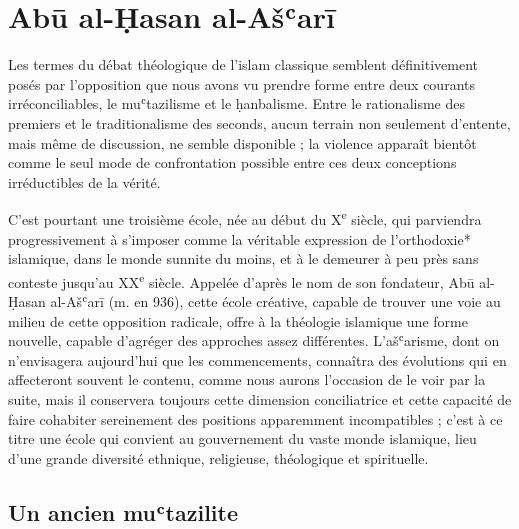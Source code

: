  

\hypertarget{suxe9ance-4}{%
\chapter{Abū al-Ḥasan al-Ašʿarī}\label{suxe9ance-4}}

Les termes du débat théologique de l'islam classique semblent
définitivement posés par l'opposition que nous avons vu prendre forme
entre deux courants irréconciliables, le muʿtazilisme et le ḥanbalisme.
Entre le rationalisme des premiers et le traditionalisme des seconds,
aucun terrain non seulement d'entente, mais même de discussion, ne
semble disponible ; la violence apparaît bientôt comme le seul mode de
confrontation possible entre ces deux conceptions irréductibles de la
vérité.

C'est pourtant une troisième école, née au début du X\textsuperscript{e}
siècle, qui parviendra progressivement à s'imposer comme la véritable
expression de l'orthodoxie* islamique, dans le monde sunnite du moins,
et à le demeurer à peu près sans conteste jusqu'au XX\textsuperscript{e}
siècle. Appelée d'après le nom de son fondateur, Abū al-Ḥasan al-Ašʿarī
(m. en 936), cette école créative, capable de trouver une voie au milieu
de cette opposition radicale, offre à la théologie islamique une forme
nouvelle, capable d'agréger des approches assez différentes.
L'ašʿarisme, dont on n'envisagera aujourd'hui que les commencements,
connaîtra des évolutions qui en affecteront souvent le contenu, comme
nous aurons l'occasion de le voir par la suite, mais il conservera
toujours cette dimension conciliatrice et cette capacité de faire
cohabiter sereinement des positions apparemment incompatibles ; c'est à
ce titre une école qui convient au gouvernement du vaste monde
islamique, lieu d'une grande diversité ethnique, religieuse, théologique
et spirituelle.



\hypertarget{un-ancien-muux2bftazilite}{%
\section{Un ancien muʿtazilite}\label{un-ancien-muux2bftazilite}}

